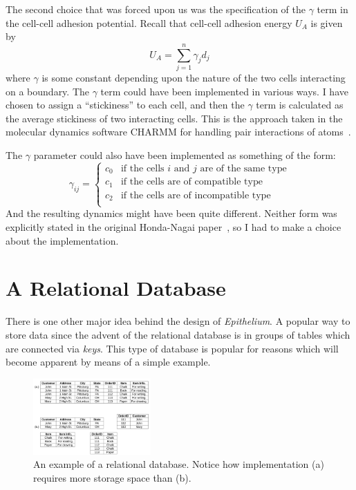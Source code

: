 The second choice that was forced upon us was the specification of the $\gamma$ term in the cell-cell adhesion potential. Recall that cell-cell adhesion energy $U_A$ is given by
\begin{equation}U_A = \displaystyle\sum\limits_{j = 1}^{n}\gamma_{j}d_{j}\end{equation}
where  $\gamma$ is some constant depending upon the nature of the two cells interacting on a boundary. The $\gamma$ term could have been implemented in various ways. I have chosen to assign a ``stickiness'' to each cell, and then the $\gamma$ term is calculated as the average stickiness of two interacting cells. This is the approach taken in the molecular dynamics software CHARMM for handling pair interactions of atoms~\cite{CHARMM}.

The $\gamma$ parameter could also have been implemented as something of the form:
\[  \gamma_{ij} =  \left\{
\begin{array}{ll}
      c_0 & \textrm{if the cells $i$ and $j$ are of the same type} \\
      c_1 &  \textrm{if the cells are of compatible type}\\
      c_2 & \textrm{if the cells are of incompatible type} \\
\end{array} 
\right. \]
And the resulting dynamics might have been quite different. Neither form was explicitly stated in the original Honda-Nagai paper~\cite{HondaNagai}, so I had to make a choice about the implementation.

\section{A Relational Database}
There is one other major idea behind the design of \emph{Epithelium}. A 
popular way to store data since the advent of the relational database is in groups of tables which are connected via \emph{keys}. This type of database is popular for reasons which will become apparent by means of a simple example. 

\begin{figure}
\centering
\includegraphics[width=0.4\textwidth]{../diagrams/relationaldb.png}
\caption[An example of a relational database.]{An example of a relational database. Notice how implementation (a) requires more storage space than (b).}
\label{fig:rdb}
\end{figure}

